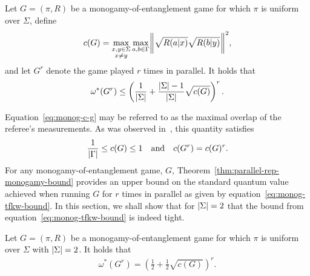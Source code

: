 \begin{theorem} \label{thm:parallel-rep-monogamy-bound}
	Let $G = (\pi,R)$ be a monogamy-of-entanglement game for which $\pi$ is uniform over $\Sigma$, define 
	\begin{align} \label{eq:monog-c-g}
		c(G) = \max_{\substack{x,y \in \Sigma \\ x \not= y}} \max_{a,b \in \Gamma} \biggl\lVert\mspace{1mu} \sqrt{R(a|x)} \sqrt{R(b|y)} \mspace{1mu}\biggr\rVert^2, 
	\end{align}
	and let $G^r$ denote the game played $r$ times in parallel. It holds that 
	\begin{align} \label{eq:monog-tfkw-bound}
		\omega^*(G^r) \leq \left( \frac{1}{\left\lvert \Sigma \right\rvert} + \frac{\left\lvert \Sigma \right\rvert - 1}{\left\lvert \Sigma \right\rvert} \sqrt{c(G)} \right)^r.
	\end{align}
\end{theorem}

Equation~\eqref{eq:monog-c-g} may be referred to as the maximal overlap of the referee's measurements. As was observed in~\cite{Tomamichel2013}, this quantity satisfies
\begin{align}
	\frac{1}{\left\lvert \Gamma \right\rvert} \leq c(G) \leq 1 \quad \textnormal{and} \quad c(G^r) = c(G)^r. 
\end{align}
For any monogamy-of-entanglement game, $G$, Theorem~\ref{thm:parallel-rep-monogamy-bound} provides an upper bound on the standard quantum value achieved when running $G$ for $r$ times in parallel as given by equation~\eqref{eq:monog-tfkw-bound}. In this section, we shall show that for $\left\lvert \Sigma \right\rvert = 2$ that the bound from equation~\eqref{eq:monog-tfkw-bound} is indeed tight. 

\begin{theorem} \label{thm:monog-parallel-rep-2}
	Let $G = (\pi,R)$ be a monogamy-of-entanglement game for which $\pi$ is uniform over $\Sigma$ with $\left\lvert \Sigma \right\rvert = 2$. It holds that 
	\begin{align}
	\omega^*(G^r) = \left(\frac{1}{2} + \frac{1}{2} \sqrt{c(G)} \right)^r.
\end{align}
\end{theorem}


